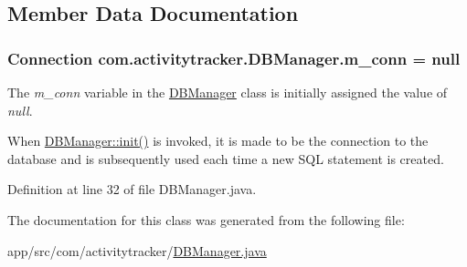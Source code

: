 \subsection{Member Data Documentation}
\subsubsection[{\texorpdfstring{m\+\_\+conn}{m_conn}}]{\setlength{\rightskip}{0pt plus 5cm}Connection com.\+activitytracker.\+D\+B\+Manager.\+m\+\_\+conn = null\hspace{0.3cm}{\ttfamily [private]}}\hypertarget{classcom_1_1activitytracker_1_1_d_b_manager_a064088d13ac09eb147fdc19268771521}{}\label{classcom_1_1activitytracker_1_1_d_b_manager_a064088d13ac09eb147fdc19268771521}
The {\itshape m\+\_\+conn} variable in the \hyperlink{classcom_1_1activitytracker_1_1_d_b_manager}{D\+B\+Manager} class is initially assigned the value of {\itshape null}.

When \hyperlink{classcom_1_1activitytracker_1_1_d_b_manager_a41df4600bb5901a26a4ea6a7108a70b9}{D\+B\+Manager\+::init()} is invoked, it is made to be the connection to the database and is subsequently used each time a new S\+QL statement is created. 

Definition at line 32 of file D\+B\+Manager.\+java.



The documentation for this class was generated from the following file\+:\begin{DoxyCompactItemize}
\item 
app/src/com/activitytracker/\hyperlink{_d_b_manager_8java}{D\+B\+Manager.\+java}\end{DoxyCompactItemize}
